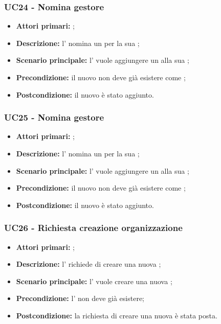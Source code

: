 \documentclass[casi-duso]{subfiles}
\begin{document}
\subsubsection{UC24 - Nomina gestore}
\label{subsub:UC24}
\begin{itemize}
  \item \textbf{Attori primari:} ;
  \item \textbf{Descrizione:} l'  nomina un  per la sua ;
  \item \textbf{Scenario principale:} l'  vuole aggiungere un  alla sua ;
  \item \textbf{Precondizione:} il nuovo  non deve già esistere come ;
  \item \textbf{Postcondizione:} il nuovo  è stato aggiunto.
\end{itemize}

\subsubsection{UC25 - Nomina gestore}
\label{subsub:UC25}
\begin{itemize}
  \item \textbf{Attori primari:} ;
  \item \textbf{Descrizione:} l'  nomina un  per la sua ;
  \item \textbf{Scenario principale:} l'  vuole aggiungere un  alla sua ;
  \item \textbf{Precondizione:} il nuovo  non deve già esistere come ;
  \item \textbf{Postcondizione:} il nuovo  è stato aggiunto.
\end{itemize}

\subsubsection{UC26 - Richiesta creazione organizzazione}
\label{subsub:UC26}
\begin{itemize}
  \item \textbf{Attori primari:} ;
  \item \textbf{Descrizione:} l'  richiede di creare una nuova ;
  \item \textbf{Scenario principale:} l'  vuole creare una nuova ;
  \item \textbf{Precondizione:} l'  non deve già esistere;
  \item \textbf{Postcondizione:} la richiesta di creare una nuova  è stata posta.
\end{itemize}
\end{document}
